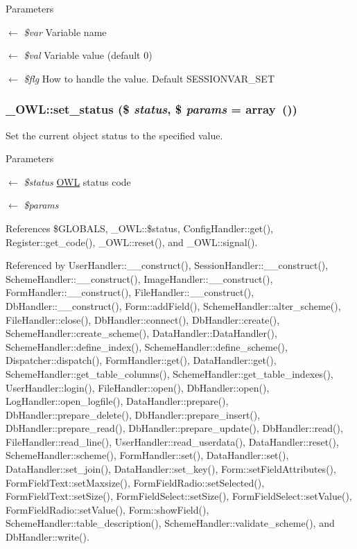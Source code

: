 \begin{DoxyParams}{Parameters}
\item[\mbox{$\leftarrow$} {\em \$var}]Variable name \item[\mbox{$\leftarrow$} {\em \$val}]Variable value (default 0) \item[\mbox{$\leftarrow$} {\em \$flg}]How to handle the value. Default SESSIONVAR\_\-SET \end{DoxyParams}
\subsubsection[{set\_\-status}]{\setlength{\rightskip}{0pt plus 5cm}\_\-OWL::set\_\-status (\$ {\em status}, \/  \$ {\em params} = {\ttfamily array~()})}\label{class__OWL_aea912d0ede9b3c2a69b79072d94d4787}
Set the current object status to the specified value.


\begin{DoxyParams}{Parameters}
\item[\mbox{$\leftarrow$} {\em \$status}]\hyperlink{classOWL}{OWL} status code \item[\mbox{$\leftarrow$} {\em \$params}]\end{DoxyParams}


References \$GLOBALS, \_\-OWL::\$status, ConfigHandler::get(), Register::get\_\-code(), \_\-OWL::reset(), and \_\-OWL::signal().



Referenced by UserHandler::\_\-\_\-construct(), SessionHandler::\_\-\_\-construct(), SchemeHandler::\_\-\_\-construct(), ImageHandler::\_\-\_\-construct(), FormHandler::\_\-\_\-construct(), FileHandler::\_\-\_\-construct(), DbHandler::\_\-\_\-construct(), Form::addField(), SchemeHandler::alter\_\-scheme(), FileHandler::close(), DbHandler::connect(), DbHandler::create(), SchemeHandler::create\_\-scheme(), DataHandler::DataHandler(), SchemeHandler::define\_\-index(), SchemeHandler::define\_\-scheme(), Dispatcher::dispatch(), FormHandler::get(), DataHandler::get(), SchemeHandler::get\_\-table\_\-columns(), SchemeHandler::get\_\-table\_\-indexes(), UserHandler::login(), FileHandler::open(), DbHandler::open(), LogHandler::open\_\-logfile(), DataHandler::prepare(), DbHandler::prepare\_\-delete(), DbHandler::prepare\_\-insert(), DbHandler::prepare\_\-read(), DbHandler::prepare\_\-update(), DbHandler::read(), FileHandler::read\_\-line(), UserHandler::read\_\-userdata(), DataHandler::reset(), SchemeHandler::scheme(), FormHandler::set(), DataHandler::set(), DataHandler::set\_\-join(), DataHandler::set\_\-key(), Form::setFieldAttributes(), FormFieldText::setMaxsize(), FormFieldRadio::setSelected(), FormFieldText::setSize(), FormFieldSelect::setSize(), FormFieldSelect::setValue(), FormFieldRadio::setValue(), Form::showField(), SchemeHandler::table\_\-description(), SchemeHandler::validate\_\-scheme(), and DbHandler::write().

